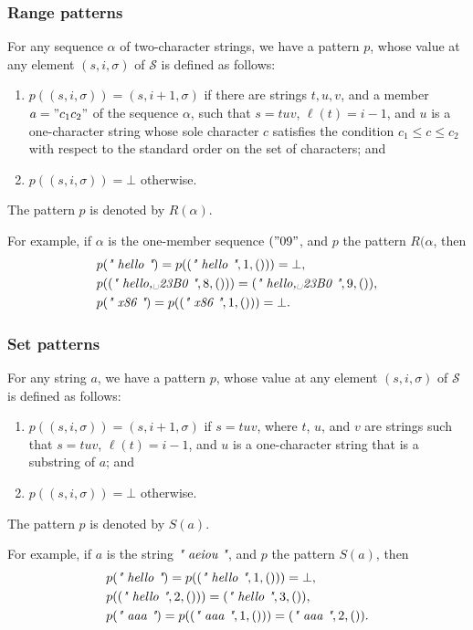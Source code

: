 \documentclass{article}
\begin{document}
\subsubsection{Range patterns}
\label{sec:9vfw1yf3}

For any sequence \(\alpha\) of two-character strings, we have a
pattern \(p\), whose value at any element \((s, i, \sigma)\) of
\(\mathscr{S}\) is defined as follows:
\begin{enumerate}
\item \(p((s, i, \sigma)) = (s, i + 1, \sigma)\) if there are strings
  \(t, u, v\), and a member \(a = "c_1c_2"\) of the sequence
  \(\alpha\), such that \(s = tuv\), \(\ell(t) = i - 1\), and \(u\) is
  a one-character string whose sole character \(c\) satisfies the
  condition \(c_1 \leq c \leq c_2\) with respect to the standard order
  on the set of characters; and
\item \(p((s, i, \sigma)) = \bot\) otherwise.
\end{enumerate}
The pattern \(p\) is denoted by \(R(\alpha)\).

For example, if \(\alpha\) is the one-member sequence \(("09"\), and
\(p\) the pattern \(R(\alpha\), then
\begin{align*}
  &p(\text{\itshape" hello "}) = p((\text{\itshape" hello "}, 1, ())) = \bot, \\
  &p((\text{\itshape" hello,␣23B0 "}, 8, ())) = (\text{\itshape" hello,␣23B0 "}, 9, ()), \\
  &p(\text{\itshape" x86 "}) = p((\text{\itshape" x86 "}, 1, ())) = \bot.
\end{align*}

\subsubsection{Set patterns}
\label{sec:zxaanwjq}

For any string \(a\), we have a pattern \(p\), whose value at any
element \((s, i, \sigma)\) of \(\mathscr{S}\) is defined as follows:
\begin{enumerate}
\item \(p((s, i, \sigma)) = (s, i + 1, \sigma)\) if \(s = tuv\), where
  \(t\), \(u\), and \(v\) are strings such that \(s = tuv\),
  \(\ell(t) = i - 1\), and \(u\) is a one-character string that is a
  substring of \(a\); and
\item \(p((s, i, \sigma)) = \bot\) otherwise.
\end{enumerate}
The pattern \(p\) is denoted by \(S(a)\).

For example, if \(a\) is the string \(\text{\itshape" aeiou "}\), and \(p\) the
pattern \(S(a)\), then
\begin{align*}
  &p(\text{\itshape" hello "}) = p((\text{\itshape" hello "}, 1, ())) = \bot, \\
  &p((\text{\itshape" hello "}, 2, ())) = (\text{\itshape" hello "}, 3, ()), \\
  &p(\text{\itshape" aaa "}) = p((\text{\itshape" aaa "}, 1, ())) = (\text{\itshape" aaa "}, 2, ()).
\end{align*}
\end{document}
